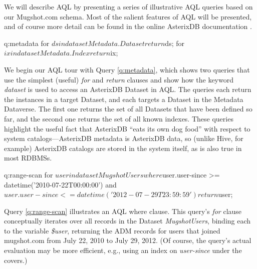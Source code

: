 We will describe AQL by presenting a series of illustrative AQL queries based on our Mugshot.com schema. 
Most of the salient features of AQL will be presented, and of course more detail can be found in the online AsterixDB documentation \cite{docs}.

\begin{query}{q:metadata}
for $ds in dataset Metadata.Dataset return $ds;
for $ix in dataset Metadata.Index return $ix;
\end{query}

We begin our AQL tour with Query \ref{q:metadata}, which shows two queries that use the simplest (useful) \emph{for} and \emph{return} clauses and show how the keyword \emph{dataset} is used to access an AsterixDB Dataset in AQL.  
The queries each return the instances in a target Dataset, and each targets a Dataset in the Metadata Dataverse. 
The first one returns the set of all Datasets that have been defined so far, and the second one returns the set of all known indexes. 
These queries highlight the useful fact that AsterixDB ``eats its own dog food'' with respect to system catalogs---AsterixDB metadata is AsterixDB data, so (unlike Hive, for example) AsterixDB catalogs are stored in the system itself, as is also true in most RDBMSs.


\begin{query}{q:range-scan}
for $user in dataset MugshotUsers
where $user.user-since >= datetime('2010-07-22T00:00:00')
  and $user.user-since <= datetime('2012-07-29T23:59:59')
return $user;
\end{query}

Query \ref{q:range-scan} illustrates an AQL where clause. This query's \emph{for} clause conceptually iterates over all records in the Dataset \emph{MugshotUsers}, binding each to the variable \emph{\$user}, returning the ADM records for users  that joined mugshot.com from July 22, 2010 to July 29, 2012.
(Of course,  the query's actual evaluation may be more efficient, e.g., using an index on \emph{user-since} under the covers.) 

